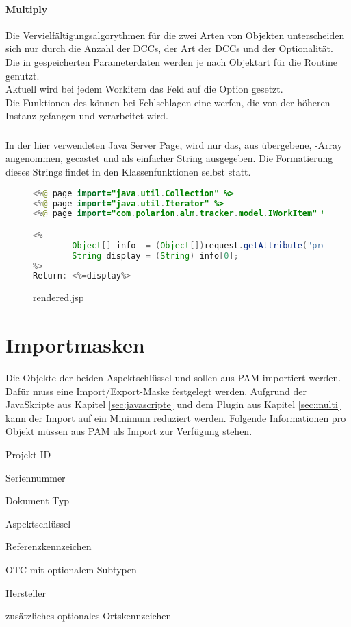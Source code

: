 \paragraph{Multiply}
Die Vervielfältigungsalgorythmen für die zwei Arten von Objekten unterscheiden sich nur durch die Anzahl der DCCs, der Art der DCCs und der Optionalität.
Die in  gespeicherten Parameterdaten werden je nach Objektart für die Routine genutzt.\\
Aktuell wird bei jedem Workitem das Feld  auf die Option  gesetzt.\\
Die Funktionen des  können bei Fehlschlagen eine  werfen, die von der höheren Instanz  gefangen und verarbeitet wird.
%
%
%
\newpage
\subsubsection{}
\label{sub:jsp}
In der hier verwendeten Java Server Page, wird nur das, aus  übergebene, -Array angenommen, gecastet und als einfacher String ausgegeben.
Die Formatierung dieses Strings findet in den Klassenfunktionen selbst statt.
\begin{figure}[H]
\begin{lstlisting}[language=Java]
<%@ page import="java.util.Collection" %>
<%@ page import="java.util.Iterator" %>
<%@ page import="com.polarion.alm.tracker.model.IWorkItem" %>

<%
	    Object[] info  = (Object[])request.getAttribute("properties");
		String display = (String) info[0];
%>
Return: <%=display%>
\end{lstlisting}
\caption{rendered.jsp}
\label{fig:jsp}
\end{figure}
\newpage
\section{Importmasken}
\label{sec:importmask}
Die Objekte der beiden Aspektschlüssel  und  sollen aus PAM importiert werden. Dafür muss eine Import/Export-Maske festgelegt werden. Aufgrund der JavaSkripte aus Kapitel \ref{sec:javascripte} und dem Plugin aus Kapitel \ref{sec:multi} kann der Import auf ein Minimum reduziert werden.
Folgende Informationen pro Objekt müssen aus PAM als Import zur Verfügung stehen.
\begin{compactitem}
	\item Projekt ID
	\item Seriennummer
	\item Dokument Typ
	\item Aspektschlüssel
	\item Referenzkennzeichen
	\item OTC mit optionalem Subtypen
	\item Hersteller
	\item zusätzliches optionales Ortskennzeichen
\end{compactitem}
